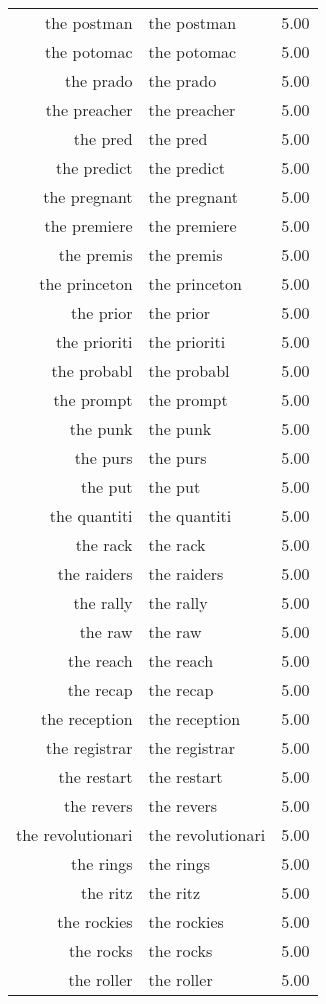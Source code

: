 \begin{table}[ht]
\begin{tabular}{rlr}
  the postman & the postman & 5.00 \\ 
  the potomac & the potomac & 5.00 \\ 
  the prado & the prado & 5.00 \\ 
  the preacher & the preacher & 5.00 \\ 
  the pred & the pred & 5.00 \\ 
  the predict & the predict & 5.00 \\ 
  the pregnant & the pregnant & 5.00 \\ 
  the premiere & the premiere & 5.00 \\ 
  the premis & the premis & 5.00 \\ 
  the princeton & the princeton & 5.00 \\ 
  the prior & the prior & 5.00 \\ 
  the prioriti & the prioriti & 5.00 \\ 
  the probabl & the probabl & 5.00 \\ 
  the prompt & the prompt & 5.00 \\ 
  the punk & the punk & 5.00 \\ 
  the purs & the purs & 5.00 \\ 
  the put & the put & 5.00 \\ 
  the quantiti & the quantiti & 5.00 \\ 
  the rack & the rack & 5.00 \\ 
  the raiders & the raiders & 5.00 \\ 
  the rally & the rally & 5.00 \\ 
  the raw & the raw & 5.00 \\ 
  the reach & the reach & 5.00 \\ 
  the recap & the recap & 5.00 \\ 
  the reception & the reception & 5.00 \\ 
  the registrar & the registrar & 5.00 \\ 
  the restart & the restart & 5.00 \\ 
  the revers & the revers & 5.00 \\ 
  the revolutionari & the revolutionari & 5.00 \\ 
  the rings & the rings & 5.00 \\ 
  the ritz & the ritz & 5.00 \\ 
  the rockies & the rockies & 5.00 \\ 
  the rocks & the rocks & 5.00 \\ 
  the roller & the roller & 5.00 \\ 

\end{tabular}
\end{table}
